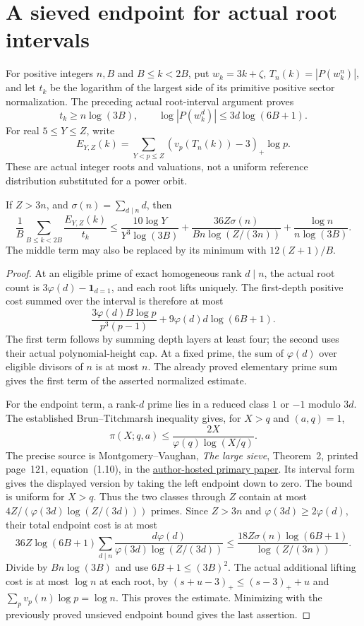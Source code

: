 \section{A sieved endpoint for actual root intervals}
\label{sw-section}

For positive integers $n,B$ and $B\le k<2B$, put
$w_k=3k+\zeta$, $T_n(k)=|P(w_k^n)|$, and let $t_k$ be the logarithm
of the largest side of its primitive positive sector normalization.
The preceding actual root-interval argument proves
\[
 t_k\ge n\log(3B),\qquad
 \log|P(w_k^d)|\le3d\log(6B+1).
\]
For real $5\le Y\le Z$, write
\[
 E_{Y,Z}(k)=\sum_{Y<p\le Z}(v_p(T_n(k))-3)_+\log p.
\]
These are actual integer roots and valuations, not a uniform reference
distribution substituted for a power orbit.

\begin{theorem}\label{sw-estimate}
If $Z>3n$, and $\sigma(n)=\sum_{d\mid n}d$, then
\[
 \frac1B\sum_{B\le k<2B}\frac{E_{Y,Z}(k)}{t_k}
 \le \frac{10\log Y}{Y^3\log(3B)}
 +\frac{36Z\sigma(n)}{Bn\log(Z/(3n))}
 +\frac{\log n}{n\log(3B)}.
\]
The middle term may also be replaced by its minimum with $12(Z+1)/B$.
\end{theorem}
\begin{proof}
At an eligible prime of exact homogeneous rank $d\mid n$, the
actual root count is $3\varphi(d)-\mathbf1_{d=1}$, and each root
lifts uniquely. The first-depth positive cost summed over the interval
is therefore at most
\[
 \frac{3\varphi(d)B\log p}{p^3(p-1)}
       +9\varphi(d)d\log(6B+1).
\]
The first term follows by summing depth layers at least four; the
second uses their actual polynomial-height cap. At a fixed prime,
the sum of $\varphi(d)$ over eligible divisors of $n$ is at most $n$.
The already proved elementary prime sum gives the first term of the
asserted normalized estimate.

For the endpoint term, a rank-$d$ prime lies in a reduced class
$1$ or $-1$ modulo $3d$. The established Brun--Titchmarsh inequality
gives, for $X>q$ and $(a,q)=1$,
\[
 \pi(X;q,a)\le\frac{2X}{\varphi(q)\log(X/q)}.
\]
The precise source is Montgomery--Vaughan, \emph{The large sieve},
Theorem~2, printed page~121, equation~(1.10), in the
\href{https://personal.science.psu.edu/rcv4/personal/Publications/large_sieve.pdf}{author-hosted primary paper}.
Its interval form gives the displayed version by taking the left
endpoint down to zero. The bound is uniform for $X>q$.
Thus the two classes through $Z$ contain at most
$4Z/(\varphi(3d)\log(Z/(3d)))$ primes. Since $Z>3n$ and
$\varphi(3d)\ge2\varphi(d)$, their total endpoint cost is at most
\[
 36Z\log(6B+1)\sum_{d\mid n}
 \frac{d\varphi(d)}{\varphi(3d)\log(Z/(3d))}
 \le\frac{18Z\sigma(n)\log(6B+1)}{\log(Z/(3n))}.
\]
Divide by $Bn\log(3B)$ and use $6B+1\le(3B)^2$.
The actual additional lifting cost is at most $\log n$ at each root,
by $(s+u-3)_+\le(s-3)_++u$ and $\sum_pv_p(n)\log p=\log n$.
This proves the estimate. Minimizing with the previously proved
unsieved endpoint bound gives the last assertion.
\end{proof}

